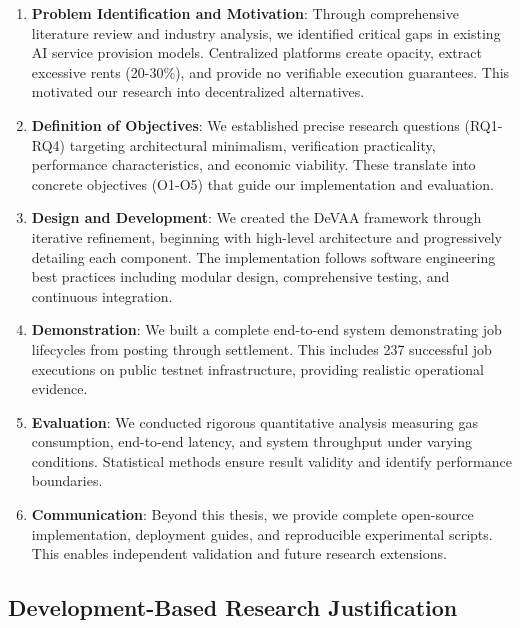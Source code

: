 \begin{enumerate}
    \item \textbf{Problem Identification and Motivation}: Through comprehensive literature review and industry analysis, we identified critical gaps in existing AI service provision models. Centralized platforms create opacity, extract excessive rents (20-30\%), and provide no verifiable execution guarantees. This motivated our research into decentralized alternatives.
    
    \item \textbf{Definition of Objectives}: We established precise research questions (RQ1-RQ4) targeting architectural minimalism, verification practicality, performance characteristics, and economic viability. These translate into concrete objectives (O1-O5) that guide our implementation and evaluation.
    
    \item \textbf{Design and Development}: We created the DeVAA framework through iterative refinement, beginning with high-level architecture and progressively detailing each component. The implementation follows software engineering best practices including modular design, comprehensive testing, and continuous integration.
    
    \item \textbf{Demonstration}: We built a complete end-to-end system demonstrating job lifecycles from posting through settlement. This includes 237 successful job executions on public testnet infrastructure, providing realistic operational evidence.
    
    \item \textbf{Evaluation}: We conducted rigorous quantitative analysis measuring gas consumption, end-to-end latency, and system throughput under varying conditions. Statistical methods ensure result validity and identify performance boundaries.
    
    \item \textbf{Communication}: Beyond this thesis, we provide complete open-source implementation, deployment guides, and reproducible experimental scripts. This enables independent validation and future research extensions.
\end{enumerate}

\subsection{Development-Based Research Justification}

